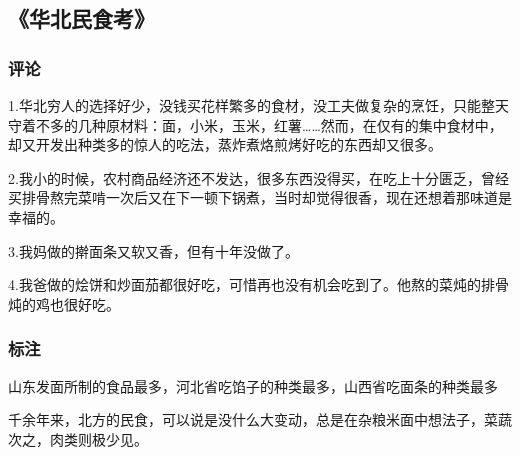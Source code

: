 \subsection{《华北民食考》}

\subsubsection{评论}
1.华北穷人的选择好少，没钱买花样繁多的食材，没工夫做复杂的烹饪，只能整天守着不多的几种原材料：面，小米，玉米，红薯……然而，在仅有的集中食材中，却又开发出种类多的惊人的吃法，蒸炸煮烙煎烤好吃的东西却又很多。

2.我小的时候，农村商品经济还不发达，很多东西没得买，在吃上十分匮乏，曾经买排骨熬完菜啃一次后又在下一顿下锅煮，当时却觉得很香，现在还想着那味道是幸福的。

3.我妈做的擀面条又软又香，但有十年没做了。

4.我爸做的烩饼和炒面茄都很好吃，可惜再也没有机会吃到了。他熬的菜炖的排骨炖的鸡也很好吃。

\subsubsection{标注}
山东发面所制的食品最多，河北省吃馅子的种类最多，山西省吃面条的种类最多

千余年来，北方的民食，可以说是没什么大变动，总是在杂粮米面中想法子，菜蔬次之，肉类则极少见。